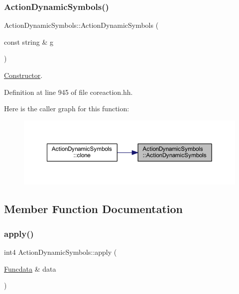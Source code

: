 \subsubsection{\texorpdfstring{ActionDynamicSymbols()}{ActionDynamicSymbols()}}
{\footnotesize\ttfamily Action\+Dynamic\+Symbols\+::\+Action\+Dynamic\+Symbols (\begin{DoxyParamCaption}\item[{const string \&}]{g }\end{DoxyParamCaption})\hspace{0.3cm}{\ttfamily [inline]}}



\mbox{\hyperlink{class_constructor}{Constructor}}. 



Definition at line 945 of file coreaction.\+hh.

Here is the caller graph for this function\+:
\nopagebreak
\begin{figure}[H]
\begin{center}
\leavevmode
\includegraphics[width=350pt]{class_action_dynamic_symbols_a635ac54796ce1cbe793cd1ef8190db59_icgraph}
\end{center}
\end{figure}


\subsection{Member Function Documentation}
\mbox{\label{class_action_dynamic_symbols_aa3c25f3a649481cc9c783609295b60b8}} 
\subsubsection{\texorpdfstring{apply()}{apply()}}
{\footnotesize\ttfamily int4 Action\+Dynamic\+Symbols\+::apply (\begin{DoxyParamCaption}\item[{\mbox{\hyperlink{class_funcdata}{Funcdata}} \&}]{data }\end{DoxyParamCaption})\hspace{0.3cm}{\ttfamily [virtual]}}



